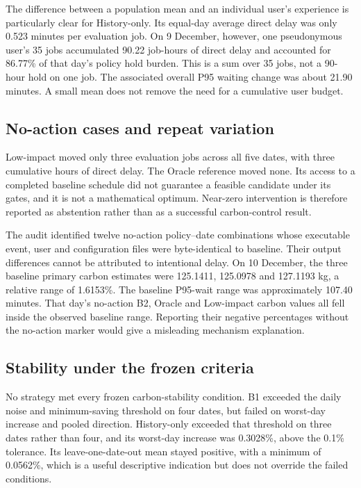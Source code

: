 The difference between a population mean and an individual user's experience is particularly clear for History-only. Its equal-day average direct delay was only 0.523 minutes per evaluation job. On 9 December, however, one pseudonymous user's 35 jobs accumulated 90.22 job-hours of direct delay and accounted for 86.77\% of that day's policy hold burden. This is a sum over 35 jobs, not a 90-hour hold on one job. The associated overall P95 waiting change was about 21.90 minutes. A small mean does not remove the need for a cumulative user budget.


\FloatBarrier

\subsection{No-action cases and repeat variation}
Low-impact moved only three evaluation jobs across all five dates, with three cumulative hours of direct delay. The Oracle reference moved none. Its access to a completed baseline schedule did not guarantee a feasible candidate under its gates, and it is not a mathematical optimum. Near-zero intervention is therefore reported as abstention rather than as a successful carbon-control result.

The audit identified twelve no-action policy--date combinations whose executable event, user and configuration files were byte-identical to baseline. Their output differences cannot be attributed to intentional delay. On 10 December, the three baseline primary carbon estimates were 125.1411, 125.0978 and 127.1193 kg, a relative range of 1.6153\%. The baseline P95-wait range was approximately 107.40 minutes. That day's no-action B2, Oracle and Low-impact carbon values all fell inside the observed baseline range. Reporting their negative percentages without the no-action marker would give a misleading mechanism explanation.

\FloatBarrier

\subsection{Stability under the frozen criteria}
No strategy met every frozen carbon-stability condition. B1 exceeded the daily noise and minimum-saving threshold on four dates, but failed on worst-day increase and pooled direction. History-only exceeded that threshold on three dates rather than four, and its worst-day increase was 0.3028\%, above the 0.1\% tolerance. Its leave-one-date-out mean stayed positive, with a minimum of 0.0562\%, which is a useful descriptive indication but does not override the failed conditions.

